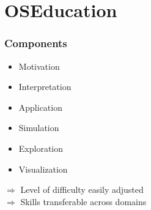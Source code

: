 \section{OSEducation}
\begin{frame}\frametitle{Components}

	\begin{multicols}{2}
	\vspace{0.3cm}
	\begin{itemize}\setlength\itemsep{1em}
	\item Motivation
	\item Interpretation
	\item Application
	\end{itemize}




  \vspace{0.3cm}
	\begin{itemize}\setlength\itemsep{1em}
	\item Simulation
	\item Exploration
	\item Visualization
	\end{itemize}
	\end{multicols}

	\pause

	\hspace{0.3cm}$\Rightarrow$  Level of difficulty easily adjusted\\\vspace{1em}
	\pause
	\hspace{0.3cm}$\Rightarrow$  Skills transferable across domains

\end{frame}

